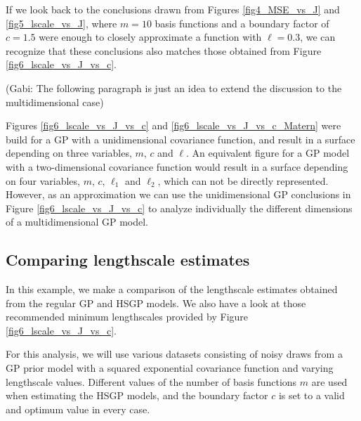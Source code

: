\documentclass[]{interact}
\theoremstyle{plain}%
\theoremstyle{definition}
\theoremstyle{remark}
\begin{document}
If we look back to the conclusions drawn from Figures \ref{fig4_MSE_vs_J} and \ref{fig5_lscale_vs_J}, where $m = 10$ basis functions and a boundary factor of $c = 1.5$ were enough to closely approximate a function with $\ell = 0.3$, we can recognize that these conclusions also matches those obtained from Figure \ref{fig6_lscale_vs_J_vs_c}.

(Gabi: The following paragraph is just an idea to extend the discussion to the multidimensional case)

Figures \ref{fig6_lscale_vs_J_vs_c} and \ref{fig6_lscale_vs_J_vs_c_Matern} were build for a GP with a unidimensional covariance function, and result in a surface depending on three variables, $m$, $c$ and $\ell$. An equivalent figure for a GP model with a two-dimensional covariance function would result in a surface depending on four variables, $m$, $c$, $\ell_1$ and $\ell_2$, which can not be directly represented. However, as an approximation we can use the unidimensional GP conclusions in Figure \ref{fig6_lscale_vs_J_vs_c} to analyze individually the different dimensions of a multidimensional GP model.
\begin{center}
\end{center}

\subsection{Comparing lengthscale estimates}

In this example, we make a comparison of the lengthscale estimates
obtained from the regular GP and HSGP models. We also have a look at those recommended minimum lengthscales provided by Figure \ref{fig6_lscale_vs_J_vs_c}.


For this analysis, we will use various datasets consisting of noisy draws from a GP prior model with a squared exponential covariance function and varying lengthscale values. Different values of the number of basis functions $m$ are used when estimating the HSGP models, and the boundary factor $c$ is set to a valid and optimum value in every case. 
\end{document}
